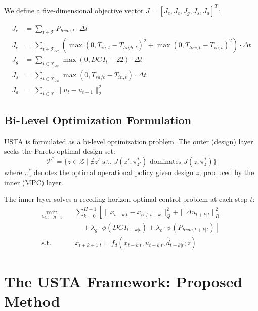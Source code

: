 \documentclass[preprint,12pt]{elsarticle}
\begin{document}
We define a five-dimensional objective vector $J = [J_e, J_c, J_g, J_s, J_a]^T$:

\begin{align}
\label{eq:energy}
J_e &= \sum_{t \in \mathcal{T}} P_{hvac,t} \cdot \Delta t \\
\label{eq:comfort}
J_c &= \sum_{t \in \mathcal{T}_{occ}} \left( \max(0, T_{in,t} - T_{high,t})^2 + \max(0, T_{low,t} - T_{in,t})^2 \right) \cdot \Delta t \\
\label{eq:glare}
J_g &= \sum_{t \in \mathcal{T}_{occ}} \max(0, DGI_t - 22) \cdot \Delta t \\
\label{eq:survivability}
J_s &= \sum_{t \in \mathcal{T}_{out}} \max(0, T_{safe} - T_{in,t}) \cdot \Delta t \\
\label{eq:actuation}
J_a &= \sum_{t \in \mathcal{T}} \|u_t - u_{t-1}\|_2^2
\end{align}

\subsection{Bi-Level Optimization Formulation}

USTA is formulated as a bi-level optimization problem. The outer (design) layer seeks the Pareto-optimal design set:
\begin{equation}
\label{eq:pareto}
\mathcal{P}^* = \{ z \in \mathcal{Z} \mid \nexists z' \text{ s.t. } J(z', \pi^*_{z'}) \text{ dominates } J(z, \pi^*_z) \}
\end{equation}
where $\pi^*_z$ denotes the optimal operational policy given design $z$, produced by the inner (MPC) layer.

The inner layer solves a receding-horizon optimal control problem at each step $t$:
\begin{equation}
\label{eq:mpc}
\begin{aligned}
\min_{u_{t:t+H-1}} \quad & \sum_{k=0}^{H-1} \left[ \|x_{t+k|t} - x_{ref,t+k}\|_Q^2 + \|\Delta u_{t+k|t}\|_R^2 \right. \\
& \left. \quad + \lambda_g \cdot \phi(DGI_{t+k|t}) + \lambda_e \cdot \psi(P_{hvac,t+k|t}) \right] \\
\text{s.t.} \quad & x_{t+k+1|t} = f_d(x_{t+k|t}, u_{t+k|t}, \hat{d}_{t+k|t}; z)
\end{aligned}
\end{equation}

\section{The USTA Framework: Proposed Method}
\label{sec:method}
\end{document}
